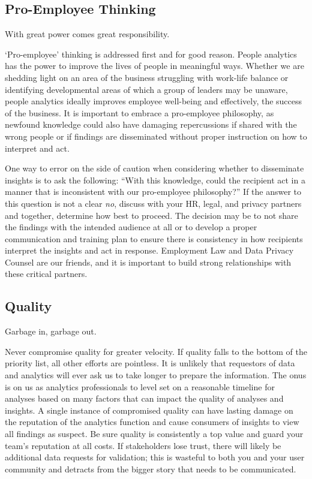 \documentclass[
]{book}
\begin{document}
\hypertarget{pro-employee-thinking}{%
\subsection{Pro-Employee Thinking}\label{pro-employee-thinking}}

With great power comes great responsibility.

`Pro-employee' thinking is addressed first and for good reason. People analytics has the power to improve the lives of people in meaningful ways. Whether we are shedding light on an area of the business struggling with work-life balance or identifying developmental areas of which a group of leaders may be unaware, people analytics ideally improves employee well-being and effectively, the success of the business. It is important to embrace a pro-employee philosophy, as newfound knowledge could also have damaging repercussions if shared with the wrong people or if findings are disseminated without proper instruction on how to interpret and act.

One way to error on the side of caution when considering whether to disseminate insights is to ask the following: ``With this knowledge, could the recipient act in a manner that is inconsistent with our pro-employee philosophy?'' If the answer to this question is not a clear \emph{no}, discuss with your HR, legal, and privacy partners and together, determine how best to proceed. The decision may be to not share the findings with the intended audience at all or to develop a proper communication and training plan to ensure there is consistency in how recipients interpret the insights and act in response. Employment Law and Data Privacy Counsel are our friends, and it is important to build strong relationships with these critical partners.

\hypertarget{quality}{%
\subsection{Quality}\label{quality}}

Garbage in, garbage out.

Never compromise quality for greater velocity. If quality falls to the bottom of the priority list, all other efforts are pointless. It is unlikely that requestors of data and analytics will ever ask us to take longer to prepare the information. The onus is on us as analytics professionals to level set on a reasonable timeline for analyses based on many factors that can impact the quality of analyses and insights. A single instance of compromised quality can have lasting damage on the reputation of the analytics function and cause consumers of insights to view all findings as suspect. Be sure quality is consistently a top value and guard your team's reputation at all costs. If stakeholders lose trust, there will likely be additional data requests for validation; this is wasteful to both you and your user community and detracts from the bigger story that needs to be communicated.
\end{document}
